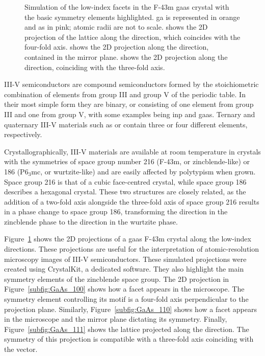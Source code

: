 \begin{figure}
{
    }
    \caption[Low-index facets in the F-43m \acs{gaas} crystal.]{Simulation of the low-index facets in the F-43m \acs{gaas} crystal with the basic symmetry elements highlighted. \Acl{ga} is represented in orange and \acs{as} in pink; atomic radii are not to scale.  shows the 2D projection of the lattice along the  direction, which coincides with the four-fold axis.  shows the 2D projection along the  direction, contained in the mirror plane.  shows the 2D projection along the  direction, coinciding with the three-fold axis.}
    \label{fig:ZB_low_index_facets}
\end{figure}

III-V semiconductors are compound semiconductors formed by the stoichiometric combination of elements from group III and group V of the periodic table. In their most simple form they are binary, or consisting of one element from group III and one from group V, with some examples being \acs{inp} and \acs{gaas}. Ternary and quaternary III-V materials such as  or  contain three or four different elements, respectively. 

Crystallographically, III-V materials are available at room temperature in crystals with the symmetries of space group number \num{216} (F-43m, or zincblende-like) or \num{186} (P6\(_3\)mc, or wurtzite-like) and are easily affected by polytypism when grown. Space group \num{216} is that of a cubic face-centred crystal, while space group \num{186} describes a hexagonal crystal. These two structures are closely related, as the addition of a two-fold axis alongside the three-fold axis of space group \num{216} results in a phase change to space group \num{186}, transforming the  direction in the zincblende phase to the  direction in the wurtzite phase. 

Figure~\ref{fig:ZB_low_index_facets} shows the 2D projections of a \acs{gaas} F-43m crystal along the low-index directions. These projections are useful for the interpretation of atomic-resolution microscopy images of III-V semiconductors. These simulated projections were created using CrystalKit, a dedicated software. They also highlight the main symmetry elements of the zincblende space group. The 2D projection in Figure~\ref{subfig:GaAs_100} shows how a  facet appears in the microscope. The symmetry element controlling its motif is a four-fold axis perpendicular to the projection plane. Similarly, Figure~\ref{subfig:GaAs_110} shows how a  facet appears in the microscope and the mirror plane dictating its symmetry. Finally, Figure~\ref{subfig:GaAs_111} shows the lattice projected along the  direction. The symmetry of this projection is compatible with a three-fold axis coinciding with the  vector.

